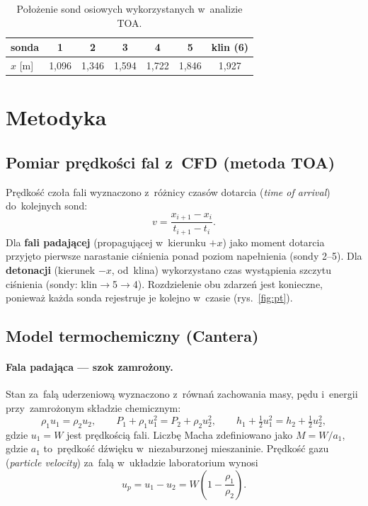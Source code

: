 \documentclass[11pt,a4paper]{article}
\begin{document}
\begin{table}[h]
\centering
\caption{Położenie sond osiowych wykorzystanych w~analizie TOA.}
\label{tab:probes}
\begin{tabular}{lcccccc}
\toprule
sonda & 1 & 2 & 3 & 4 & 5 & klin (6) \\
\midrule
$x$ [\si{\meter}] & 1,096 & 1,346 & 1,594 & 1,722 & 1,846 & 1,927 \\
\bottomrule
\end{tabular}
\end{table}

\section{Metodyka}

\subsection{Pomiar prędkości fal z~CFD (metoda TOA)}
Prędkość czoła fali wyznaczono z~różnicy czasów dotarcia (\emph{time of arrival})
do~kolejnych sond:
\begin{equation}
v=\frac{x_{i+1}-x_i}{t_{i+1}-t_i}.
\end{equation}
Dla \textbf{fali padającej} (propagującej w~kierunku $+x$) jako moment dotarcia
przyjęto pierwsze narastanie ciśnienia ponad poziom napełnienia
(sondy 2--5). Dla \textbf{detonacji} (kierunek $-x$, od~klina) wykorzystano
czas wystąpienia szczytu ciśnienia (sondy: klin$\to$5$\to$4). Rozdzielenie
obu zdarzeń jest konieczne, ponieważ każda sonda rejestruje je kolejno
w~czasie (rys.~\ref{fig:pt}).

\subsection{Model termochemiczny (Cantera)}
\paragraph{Fala padająca --- szok zamrożony.}
Stan za~falą uderzeniową wyznaczono z~równań zachowania masy, pędu i~energii
przy~zamrożonym składzie chemicznym:
\begin{equation}
\rho_1 u_1=\rho_2 u_2,\qquad
P_1+\rho_1 u_1^2=P_2+\rho_2 u_2^2,\qquad
h_1+\tfrac12 u_1^2=h_2+\tfrac12 u_2^2,
\end{equation}
gdzie $u_1=W$ jest prędkością fali. Liczbę Macha zdefiniowano jako
$M=W/a_1$, gdzie $a_1$ to~prędkość dźwięku w~niezaburzonej mieszaninie.
Prędkość gazu (\emph{particle velocity}) za~falą w~układzie laboratorium wynosi
\begin{equation}
u_p=u_1-u_2=W\!\left(1-\frac{\rho_1}{\rho_2}\right).
\label{eq:up}
\end{equation}
\end{document}
